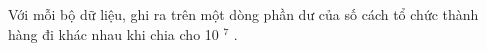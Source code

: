Với mỗi bộ dữ liệu, ghi ra trên một dòng phần dư của số cách tổ chức thành hàng đi khác nhau khi chia cho 10 $^ 7 $ .